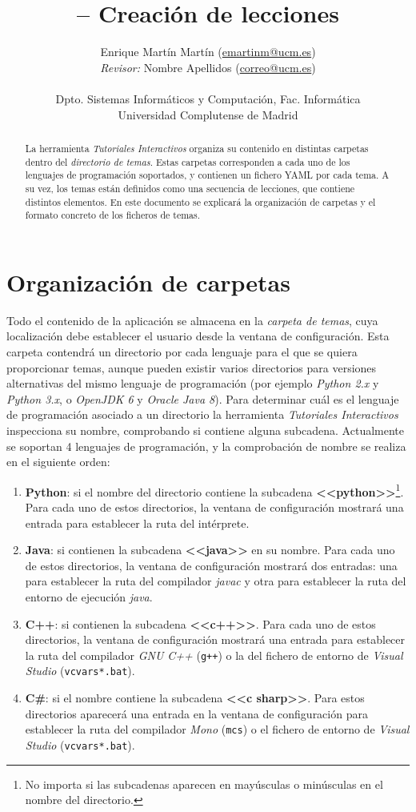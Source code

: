 \documentclass[]{article}
\title{\toolname{} -- Creación de lecciones}
\author{Enrique Martín Martín (\url{emartinm@ucm.es}) \\ \emph{Revisor:} Nombre Apellidos (\url{correo@ucm.es})\\~\\[-.4cm]
	\normalsize{Dpto. Sistemas Informáticos y Computación, Fac. Informática}\\[-0.1cm]
    \normalsize{Universidad Complutense de Madrid}}
\newcommand{\code}[1]{{\lstinline[basicstyle=\ttfamily,mathescape]!#1!}}
\newcommand{\toolname}{\emph{Tutoriales Interactivos}}
\begin{document}
\maketitle

\begin{abstract}
La herramienta \toolname{} organiza su contenido en distintas carpetas dentro del \emph{directorio de temas}. Estas carpetas corresponden a cada uno de los lenguajes de programación soportados, y contienen un fichero YAML por cada tema. A su vez, los temas están definidos como una secuencia de lecciones, que contiene distintos elementos. En este documento se explicará la organización de carpetas y el formato concreto de los ficheros de temas.
\end{abstract}


\section{Organización de carpetas}
Todo el contenido de la aplicación se almacena en la \emph{carpeta de temas}, cuya localización debe establecer el usuario desde la ventana de configuración. Esta carpeta contendrá un directorio por cada lenguaje para el que se quiera proporcionar temas, aunque pueden existir varios directorios para versiones alternativas del mismo lenguaje de programación (por ejemplo \emph{Python 2.x} y \emph{Python 3.x}, o \emph{OpenJDK 6} y \emph{Oracle Java 8}). Para determinar cuál es el lenguaje de programación asociado a un directorio la herramienta \toolname{} inspecciona su nombre, comprobando si contiene alguna subcadena. Actualmente se soportan 4 lenguajes de programación, y la comprobación de nombre se realiza en el siguiente orden:

\begin{enumerate}
  \item \textbf{Python}: si el nombre del directorio contiene la subcadena \textbf{<<python>>}\footnote{No importa si las subcadenas aparecen en mayúsculas o minúsculas en el nombre del directorio.}. Para cada uno de estos directorios, la ventana de configuración mostrará una entrada para establecer la ruta del intérprete.
  \item \textbf{Java}: si contienen la subcadena \textbf{<<java>>} en su nombre. Para cada uno de estos directorios, la ventana de configuración mostrará dos entradas: una para establecer la ruta del compilador \emph{javac} y otra para establecer la ruta del entorno de ejecución \emph{java}.
  \item \textbf{C++}: si contienen la subcadena \textbf{<<c++>>}. Para cada uno de estos directorios, la ventana de configuración mostrará una entrada para establecer la ruta del compilador \emph{GNU C++} (\code{g++}) o la del fichero de entorno de \emph{Visual Studio} (\code{vcvars*.bat}). 
  \item \textbf{C\#}: si el nombre contiene la subcadena \textbf{<<c sharp>>}. Para estos directorios aparecerá una entrada en la ventana de configuración para establecer la ruta del compilador \emph{Mono} (\code{mcs}) o el fichero de entorno de \emph{Visual Studio} (\code{vcvars*.bat}).
\end{enumerate}
\end{document}

